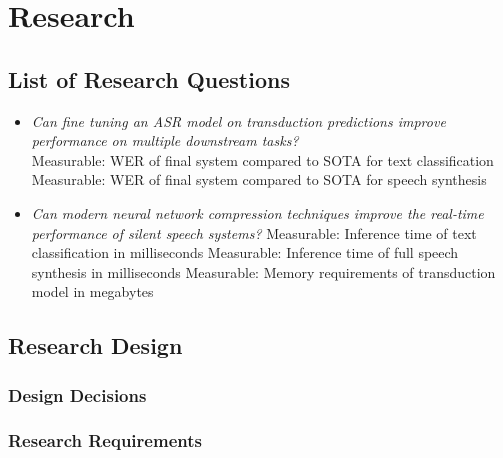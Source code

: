 \chapter{Research} \label{chap:research}

\section{List of Research Questions}

\begin{itemize}
    \item \textit{Can fine tuning an ASR model on transduction predictions
    improve performance on multiple downstream tasks?} \\
    Measurable: WER of final system compared to SOTA for text classification \\
    Measurable: WER of final system compared to SOTA for speech synthesis
    \item \textit{Can modern neural network compression techniques improve
    the real-time performance of silent speech systems?}
    Measurable: Inference time of text classification in milliseconds
    Measurable: Inference time of full speech synthesis in milliseconds
    Measurable: Memory requirements of transduction model in megabytes
\end{itemize}

\section{Research Design}



\subsection{Design Decisions}



\subsection{Research Requirements}

